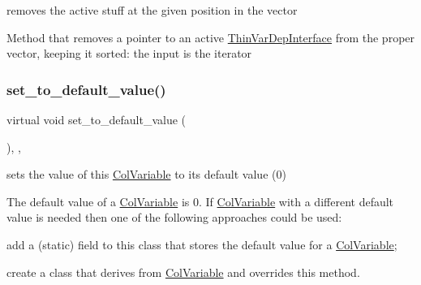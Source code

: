 removes the active stuff at the given position in the vector 

Method that removes a pointer to an active \mbox{\hyperlink{class_s_m_spp__di__unipi__it_1_1_thin_var_dep_interface}{Thin\+Var\+Dep\+Interface}} from the proper vector, keeping it sorted\+: the input is the iterator \mbox{\label{class_s_m_spp__di__unipi__it_1_1_col_variable_a758f9e908f6d1156e1a16eacaee9a586}} 
\subsubsection{\texorpdfstring{set\+\_\+to\+\_\+default\+\_\+value()}{set\_to\_default\_value()}}
{\footnotesize\ttfamily virtual void set\+\_\+to\+\_\+default\+\_\+value (\begin{DoxyParamCaption}\item[{void}]{ }\end{DoxyParamCaption})\hspace{0.3cm}{\ttfamily [inline]}, {\ttfamily [override]}, {\ttfamily [virtual]}}



sets the value of this \mbox{\hyperlink{class_s_m_spp__di__unipi__it_1_1_col_variable}{Col\+Variable}} to its default value (0) 

The default value of a \mbox{\hyperlink{class_s_m_spp__di__unipi__it_1_1_col_variable}{Col\+Variable}} is 0. If \mbox{\hyperlink{class_s_m_spp__di__unipi__it_1_1_col_variable}{Col\+Variable}} with a different default value is needed then one of the following approaches could be used\+:


\begin{DoxyItemize}
\item add a (static) field to this class that stores the default value for a \mbox{\hyperlink{class_s_m_spp__di__unipi__it_1_1_col_variable}{Col\+Variable}};
\item create a class that derives from \mbox{\hyperlink{class_s_m_spp__di__unipi__it_1_1_col_variable}{Col\+Variable}} and overrides this method. 
\end{DoxyItemize}

